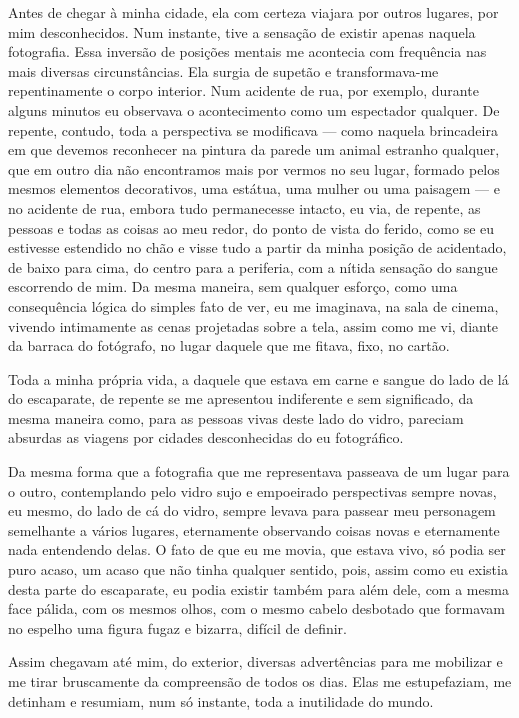 Antes de chegar à minha cidade, ela com certeza viajara por outros lugares, por mim desconhecidos. Num instante, tive a sensação de existir apenas naquela fotografia. Essa inversão de posições mentais me acontecia com frequência nas mais diversas circunstâncias. Ela surgia de supetão e transformava-me repentinamente o corpo interior. Num acidente de rua, por exemplo, durante alguns minutos eu observava o acontecimento como um espectador qualquer. De repente, contudo, toda a perspectiva se modificava --- como naquela brincadeira em que devemos reconhecer na pintura da parede um animal estranho qualquer, que em outro dia não encontramos mais por vermos no seu lugar, formado pelos mesmos elementos decorativos, uma estátua, uma mulher ou uma paisagem --- e no acidente de rua, embora tudo permanecesse intacto, eu via, de repente, as pessoas e todas as coisas ao meu redor, do ponto de vista do ferido, como se eu estivesse estendido no chão e visse tudo a partir da minha posição de acidentado, de baixo para cima, do centro para a periferia, com a nítida sensação do sangue escorrendo de mim. Da mesma maneira, sem qualquer esforço, como uma consequência lógica do simples fato de ver, eu me imaginava, na sala de cinema, vivendo intimamente as cenas projetadas sobre a tela, assim como me vi, diante da barraca do fotógrafo, no lugar daquele que me fitava, fixo, no cartão.

Toda a minha própria vida, a daquele que estava em carne e sangue do lado de lá do escaparate, de repente se me apresentou indiferente e sem significado, da mesma maneira como, para as pessoas vivas deste lado do vidro, pareciam absurdas as viagens por cidades desconhecidas do eu fotográfico.

Da mesma forma que a fotografia que me representava passeava de um lugar para o outro, contemplando pelo vidro sujo e empoeirado perspectivas sempre novas, eu mesmo, do lado de cá do vidro, sempre levava para passear meu personagem semelhante a vários lugares, eternamente observando coisas novas e eternamente nada entendendo delas. O fato de que eu me movia, que estava vivo, só podia ser puro acaso, um acaso que não tinha qualquer sentido, pois, assim como eu existia desta parte do escaparate, eu podia existir também para além dele, com a mesma face pálida, com os mesmos olhos, com o mesmo cabelo desbotado que formavam no espelho uma figura fugaz e bizarra, difícil de definir.

Assim chegavam até mim, do exterior, diversas advertências para me mobilizar e me tirar bruscamente da compreensão de todos os dias. Elas me estupefaziam, me detinham e resumiam, num só instante, toda a inutilidade do mundo.

